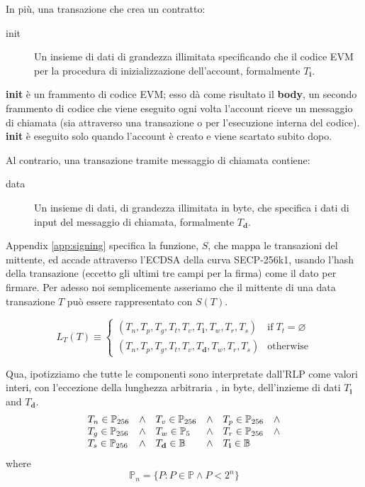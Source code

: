 \documentclass[9pt,oneside]{amsart}
\begin{document}
\begin{multicols}{2}
In più, una transazione che crea un contratto:

\begin{description}
\item[init] Un insieme di dati di grandezza illimitata specificando che il codice EVM per la procedura di inizializzazione dell'account, formalmente $T_\mathbf{i}$.
\end{description}

\textbf{init} è un frammento di codice EVM; esso dà come risultato il \textbf{body}, un secondo frammento di codice che viene eseguito ogni volta l'account riceve un messaggio di chiamata (sia attraverso una transazione o per l'esecuzione interna del codice). \textbf{init} è eseguito solo quando l'account è creato e viene scartato subito dopo.

Al contrario, una transazione tramite messaggio di chiamata contiene:

\begin{description}
\item[data] Un insieme di dati, di grandezza illimitata in byte, che specifica i dati di input del messaggio di chiamata, formalmente $T_\mathbf{d}$.
\end{description}

Appendix \ref{app:signing} specifica la funzione, $S$, che mappa le transazioni del mittente, ed accade attraverso l'ECDSA della curva SECP-256k1, usando l'hash della transazione (eccetto gli ultimi tre campi per la firma) come il dato per firmare. Per adesso noi semplicemente asseriamo che il mittente di una data transazione $T$ può essere rappresentato con $S(T)$.

\begin{equation}
L_T(T) \equiv \begin{cases}
(T_n, T_p, T_g, T_t, T_v, T_\mathbf{i}, T_w, T_r, T_s) & \text{if} \; T_t = \varnothing\\
(T_n, T_p, T_g, T_t, T_v, T_\mathbf{d}, T_w, T_r, T_s) & \text{otherwise} 
\end{cases}
\end{equation}

Qua, ipotizziamo che tutte le componenti sono interpretate dall'RLP come valori interi, con l'eccezione della lunghezza arbitraria , in byte, dell'inzieme di dati $T_\mathbf{i}$ and $T_\mathbf{d}$.
\begin{equation}
\begin{array}[t]{lclclc}
T_n \in \mathbb{P}_{256} & \wedge & T_v \in \mathbb{P}_{256} & \wedge & T_p \in \mathbb{P}_{256} & \wedge \\
T_g \in \mathbb{P}_{256} & \wedge & T_w \in \mathbb{P}_5 & \wedge & T_r \in \mathbb{P}_{256} & \wedge \\
T_s \in \mathbb{P}_{256} & \wedge & T_\mathbf{d} \in \mathbb{B} & \wedge & T_\mathbf{i} \in \mathbb{B}
\end{array}
\end{equation}
where
\begin{equation}
\mathbb{P}_n = \{ P: P \in \mathbb{P} \wedge P < 2^n \}
\end{equation}


\end{multicols}
\end{document}
